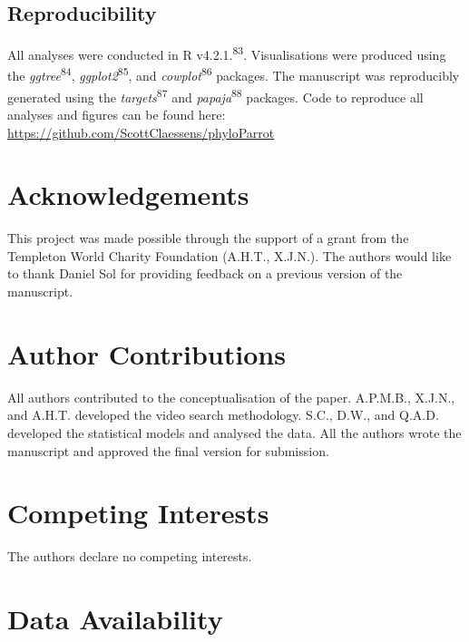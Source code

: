 \documentclass[
  man,floatsintext]{apa6}
\begin{document}
\hypertarget{reproducibility}{%
\subsection{Reproducibility}\label{reproducibility}}

All analyses were conducted in R v4.2.1.\textsuperscript{83}. Visualisations were
produced using the \emph{ggtree}\textsuperscript{84}, \emph{ggplot2}\textsuperscript{85}, and \emph{cowplot}\textsuperscript{86} packages. The manuscript was reproducibly generated using the
\emph{targets}\textsuperscript{87} and \emph{papaja}\textsuperscript{88} packages. Code to reproduce all
analyses and figures can be found here:
\url{https://github.com/ScottClaessens/phyloParrot}

\newpage
\nolinenumbers

\hypertarget{acknowledgements}{%
\section{Acknowledgements}\label{acknowledgements}}

This project was made possible through the support of a grant from the Templeton
World Charity Foundation (A.H.T., X.J.N.). The authors would like to thank
Daniel Sol for providing feedback on a previous version of the manuscript.

\hypertarget{author-contributions}{%
\section{Author Contributions}\label{author-contributions}}

All authors contributed to the conceptualisation of the paper. A.P.M.B., X.J.N.,
and A.H.T. developed the video search methodology. S.C., D.W., and Q.A.D.
developed the statistical models and analysed the data. All the authors wrote
the manuscript and approved the final version for submission.

\hypertarget{competing-interests}{%
\section{Competing Interests}\label{competing-interests}}

The authors declare no competing interests.

\hypertarget{data-availability}{%
\section{Data Availability}\label{data-availability}}
\end{document}
